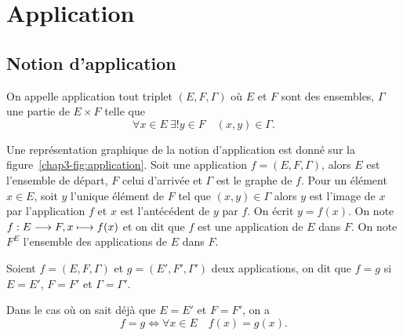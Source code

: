 \section{Application}
\label{chap3-sec:applications}
\subsection{Notion d'application}
\label{chap3-subsec:notiondapplication}
\begin{defdef}
    On appelle application tout triplet \((E, F, \Gamma)\) où \(E\) et \(F\) sont 
    des ensembles, \(\Gamma\) une partie de \(E \times F\) telle que
    \begin{equation}
        \forall x \in E \ \exists! y \in F \quad (x,y) \in \Gamma.
    \end{equation}
\end{defdef}
Une représentation graphique de la notion d'application est donné sur la 
figure~\ref{chap3-fig:application}. Soit une application \(f=(E,F,\Gamma)\), 
alors \(E\) est l'ensemble de départ, \(F\) celui d'arrivée et \(\Gamma\) est le 
graphe de \(f\).
Pour un élément \(x \in E\), soit \(y\) l'unique élément de \(F\) tel que 
\((x,y) \in \Gamma\) alors \(y\) est l'image de \(x\) par l'application \(f\) et 
\(x\) est l'antécédent de \(y\) par \(f\). On écrit \(y=f(x)\). On note 
\(f:E \longrightarrow F, x \longmapsto f(x)\) et on dit que \(f\) est une application de 
\(E\) dans \(F\). On note \(F^E\) l'ensemble des applications de \(E\) dans 
\(F\).
\begin{defdef}
    Soient \(f=(E,F,\Gamma)\) et \(g=(E',F',\Gamma')\) deux applications, on dit que 
    \(f=g\) si \(E=E'\), \(F=F'\) et \(\Gamma=\Gamma'\).
\end{defdef}
Dans le cas où on sait déjà que \(E=E'\) et \(F=F'\), on a
\begin{equation}
    f=g \iff \forall x \in E \quad f(x)=g(x).
\end{equation}
